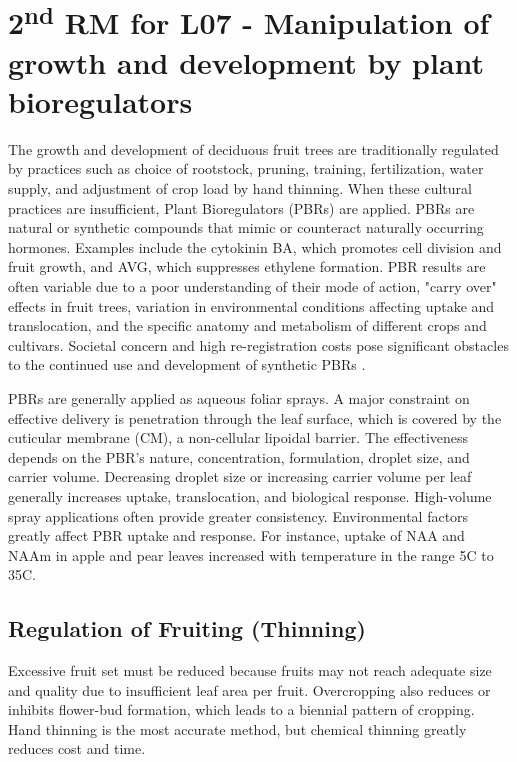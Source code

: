 \section{\texorpdfstring{2\textsuperscript{nd} RM for L07 - Manipulation of growth and development by plant bioregulators}{2nd RM for L07 - Manipulation of growth and development by plant bioregulators}}

The growth and development of deciduous fruit trees are traditionally regulated by practices such as choice of rootstock, pruning, training, fertilization, water supply, and adjustment of crop load by hand thinning. When these cultural practices are insufficient, Plant Bioregulators (PBRs) are applied. PBRs are natural or synthetic compounds that mimic or counteract naturally occurring hormones. Examples include the cytokinin BA, which promotes cell division and fruit growth, and AVG, which suppresses ethylene formation. PBR results are often variable due to a poor understanding of their mode of action, "carry over" effects in fruit trees, variation in environmental conditions affecting uptake and translocation, and the specific anatomy and metabolism of different crops and cultivars. Societal concern and high re-registration costs pose significant obstacles to the continued use and development of synthetic PBRs \cite*{rm_05.2_L07_manipulation_growth_development_plant_bioregulators}.

\vspace{0.5em}
PBRs are generally applied as aqueous foliar sprays. A major constraint on effective delivery is penetration through the leaf surface, which is covered by the cuticular membrane (CM), a non-cellular lipoidal barrier. The effectiveness depends on the PBR's nature, concentration, formulation, droplet size, and carrier volume. Decreasing droplet size or increasing carrier volume per leaf generally increases uptake, translocation, and biological response. High-volume spray applications often provide greater consistency. Environmental factors greatly affect PBR uptake and response. For instance, uptake of NAA and NAAm in apple and pear leaves increased with temperature in the range 5\textdegree C to 35\textdegree C.

\vspace{0.5em}
\subsection*{Regulation of Fruiting (Thinning)}
Excessive fruit set must be reduced because fruits may not reach adequate size and quality due to insufficient leaf area per fruit. Overcropping also reduces or inhibits flower-bud formation, which leads to a biennial pattern of cropping. Hand thinning is the most accurate method, but chemical thinning greatly reduces cost and time.

